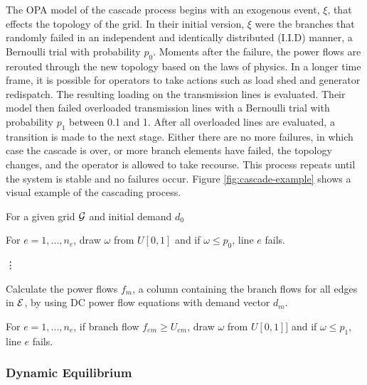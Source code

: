 The OPA model of the cascade process begins with an exogenous event, $\xi$, that effects the topology of the grid.  In their initial version, $\xi$ were the branches that randomly failed in an independent and identically distributed (I.I.D) manner, a Bernoulli trial with probability $p_0$.  Moments after the failure, the power flows are rerouted through the new topology based on the laws of physics.  In a longer time frame, it is possible for operators to take actions such as load shed and generator redispatch.  The resulting loading on the transmission lines is evaluated.  Their model then failed overloaded transmission lines with a Bernoulli trial with probability $p_1$ between  0.1 and 1.  After all overloaded lines are evaluated, a transition is made to the next stage.  Either there are no more failures, in which case the cascade is over, or more branch elements have failed, the topology changes, and the operator is allowed to take recourse.  This process repeats until the system is stable and no failures occur.  Figure \ref{fig:cascade-example} shows a visual example of the cascading process.

For a given grid $\mathcal{G}$ and initial demand $d_0$
\begin{description}\label{fast_opa}
\item[ Initial $ \xi $ ]  For $e=1,...,n_e$, draw $\omega$ from $U[0,1]$ and if $\omega \le p_0$, line $e$ fails.
\item[ ] \hspace{35px} \vdots 
\item[ Stage $m$ ]  Calculate the power flows $f_{m}$, a column containing the branch flows for all edges in $\mathcal{E}$, by using DC power flow equations with demand vector $d_m$. 

For $e=1,...,n_e$, if branch flow $f_{em} \ge U_{em}$, draw $\omega$ from $U[0,1]]$ and if $\omega \le p_1$, line $e$ fails.
\end{description}




\subsubsection{Dynamic Equilibrium}

